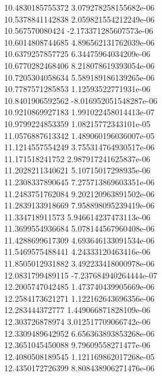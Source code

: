 {10.4830185755372 3.079278258155682e-06 \\
10.5378841142838 2.059821554212249e-06 \\
10.567570080424 -2.173371285607573e-06 \\
10.6014808744685 4.896562131762039e-06 \\
10.6379257857725 6.34475964034209e-06 \\
10.6770282468406 8.218078619393054e-06 \\
10.7205304058634 5.589189186139265e-06 \\
10.7787571285853 1.12593522771931e-06 \\
10.8401906592562 -8.016952051548287e-06 \\
10.9210869927183 1.991022458014413e-07 \\
10.9799224853359 1.08215772343101e-05 \\
11.0576887613342 1.489060196036007e-05 \\
11.1214557554249 3.755314764930517e-06 \\
11.171518241752 2.987917241625837e-06 \\
11.2028211340621 5.10715017298935e-06 \\
11.2308337890645 7.275713869603351e-06 \\
11.2483751762084 9.202120963891502e-06 \\
11.2839133918669 7.958898095239419e-06 \\
11.334718911573 5.946614237473113e-06 \\
11.3699554936684 5.078144567960408e-06 \\
11.4288699617309 4.693646133091534e-06 \\
11.5469575488441 4.24333120463416e-06 \\
11.8505012931882 3.492233418000978e-06 \\
12.0831799489115 -7.237684940264444e-07 \\
12.2005747042485 1.473740439905669e-06 \\
12.2584173621271 1.122162643696356e-06 \\
12.283444372777 1.449066871828109e-06 \\
12.303726878974 3.012517709066742e-06 \\
12.3309489642952 6.656363893853268e-06 \\
12.3651045450088 9.79609558271477e-06 \\
12.4080508189545 1.121169862017268e-05 \\
12.4350172726399 8.808438906271476e-06 \\
}

